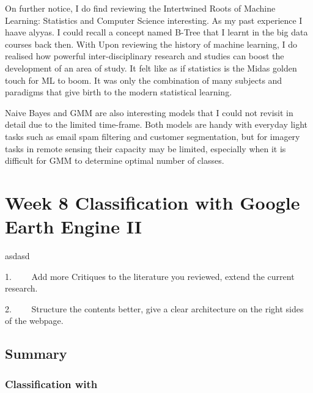 \documentclass[
  letterpaper,
  DIV=11,
  numbers=noendperiod]{scrreprt}
\begin{document}
On further notice, I do find reviewing the Intertwined Roots of Machine
Learning: Statistics and Computer Science interesting. As my past
experience I haave alyyas. I could recall a concept named B-Tree that I
learnt in the big data courses back then. With Upon reviewing the
history of machine learning, I do realised how powerful
inter-disciplinary research and studies can boost the development of an
area of study. It felt like as if statistics is the Midas golden touch
for ML to boom. It was only the combination of many subjects and
paradigms that give birth to the modern statistical learning.

Naive Bayes and GMM are also interesting models that I could not revisit
in detail due to the limited time-frame. Both models are handy with
everyday light tasks such as email spam filtering and customer
segmentation, but for imagery tasks in remote sensing their capacity may
be limited, especially when it is difficult for GMM to determine optimal
number of classes.

\hypertarget{week-8-classification-with-google-earth-engine-ii}{%
\chapter*{Week 8 Classification with Google Earth Engine
II}\label{week-8-classification-with-google-earth-engine-ii}}


asdasd

1.~~~~ Add more Critiques to the literature you reviewed, extend the
current research.

2.~~~~ Structure the contents better, give a clear architecture on the
right sides of the webpage.

\hypertarget{summary}{%
\section*{Summary}\label{summary}}


\hypertarget{classification-with}{%
\subsection*{Classification with}\label{classification-with}}
\end{document}
